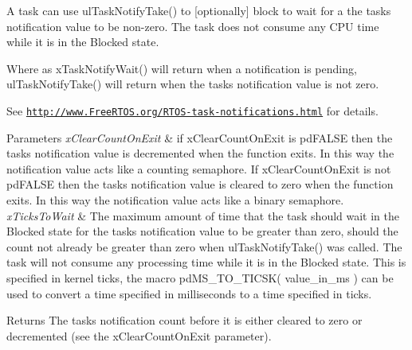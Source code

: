 A task can use ul\+Task\+Notify\+Take() to \mbox{[}optionally\mbox{]} block to wait for a the task\textquotesingle{}s notification value to be non-\/zero. The task does not consume any C\+P\+U time while it is in the Blocked state.

Where as x\+Task\+Notify\+Wait() will return when a notification is pending, ul\+Task\+Notify\+Take() will return when the task\textquotesingle{}s notification value is not zero.

See \href{http://www.FreeRTOS.org/RTOS-task-notifications.html}{\tt http\+://www.\+Free\+R\+T\+O\+S.\+org/\+R\+T\+O\+S-\/task-\/notifications.\+html} for details.


\begin{DoxyParams}{Parameters}
{\em x\+Clear\+Count\+On\+Exit} & if x\+Clear\+Count\+On\+Exit is pd\+F\+A\+L\+S\+E then the task\textquotesingle{}s notification value is decremented when the function exits. In this way the notification value acts like a counting semaphore. If x\+Clear\+Count\+On\+Exit is not pd\+F\+A\+L\+S\+E then the task\textquotesingle{}s notification value is cleared to zero when the function exits. In this way the notification value acts like a binary semaphore.\\
\hline
{\em x\+Ticks\+To\+Wait} & The maximum amount of time that the task should wait in the Blocked state for the task\textquotesingle{}s notification value to be greater than zero, should the count not already be greater than zero when ul\+Task\+Notify\+Take() was called. The task will not consume any processing time while it is in the Blocked state. This is specified in kernel ticks, the macro pd\+M\+S\+\_\+\+T\+O\+\_\+\+T\+I\+C\+S\+K( value\+\_\+in\+\_\+ms ) can be used to convert a time specified in milliseconds to a time specified in ticks.\\
\hline
\end{DoxyParams}
\begin{DoxyReturn}{Returns}
The task\textquotesingle{}s notification count before it is either cleared to zero or decremented (see the x\+Clear\+Count\+On\+Exit parameter). 
\end{DoxyReturn}
